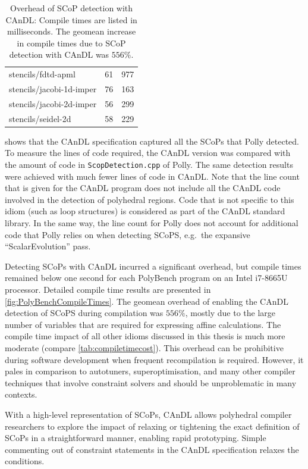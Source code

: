 \begin{table}
\begin{tabular}{lll}
        stencils/fdtd-apml         & 61 & 977 \\
        stencils/jacobi-1d-imper   & 76 & 163 \\
        stencils/jacobi-2d-imper   & 56 & 299 \\
        stencils/seidel-2d         & 58 & 229 \\
        \bottomrule
    \end{tabular}
    \caption{Overhead of SCoP detection with CAnDL:
             Compile times are listed in milliseconds.
             The geomean increase in compile times due to SCoP detection
             with CAnDL was $556\%$.}
    \label{fig:PolyBenchCompileTimes}
\end{table}

     shows that the CAnDL specification captured all the
    SCoPs that Polly detected.
    To measure the lines of code required, the CAnDL version was compared with
    the amount of code in {\tt ScopDetection.cpp} of Polly.
    The same detection results were achieved with much fewer lines of code in
    CAnDL.
    Note that the line count that is given for the CAnDL program does not
    include all the CAnDL code involved in the detection of polyhedral regions.
    Code that is not specific to this idiom (such as loop structures) is
    considered as part of the CAnDL standard library.
    In the same way, the line count for Polly does not account for additional
    code that Polly relies on when detecting SCoPS, e.g.\ the expansive
    ``ScalarEvolution'' pass.

    Detecting SCoPs with CAnDL incurred a significant overhead, but compile
    times remained below one second for each PolyBench program
    on an Intel i7-8665U processor.
    Detailed compile time results are presented in
    \autoref{fig:PolyBenchCompileTimes}.
    The geomean overhead of enabling the CAnDL detection of SCoPS during
    compilation was $556\%$, mostly due to the large number of variables
    that are required for expressing affine calculations.
    The compile time impact of all other idioms discussed in this thesis is
    much more moderate (compare \autoref{tab:compiletimecost}).
    This overhead can be prohibitive during software development when frequent
    recompilation is required.
    However, it pales in comparison to autotuners, superoptimisation, and many
    other compiler techniques that involve constraint solvers and should be
    unproblematic in many contexts.

    With a high-level representation of SCoPs, CAnDL allows polyhedral
    compiler researchers to explore the impact of relaxing or tightening the
    exact definition of SCoPs in a straightforward manner, enabling rapid
    prototyping.
    Simple commenting out of constraint statements in the CAnDL specification
    relaxes the conditions.

